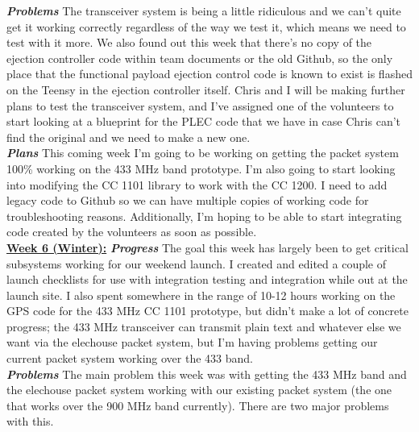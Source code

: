 \documentclass[onecolumn, draftclsnofoot, 10pt, compsoc]{IEEEtran}
\begin{document}
\textbf{\textit{{Problems}}}
\newline The transceiver system is being a little ridiculous and we can't quite get it working correctly regardless of the way we test it, which means we need to test with it more. We also found out this week that there's no copy of the ejection controller code within team documents or the old Github, so the only place that the functional payload ejection control code is known to exist is flashed on the Teensy in the ejection controller itself. Chris and I will be making further plans to test the transceiver system, and I've assigned one of the volunteers to start looking at a blueprint for the PLEC code that we have in case Chris can't find the original and we need to make a new one. \\

\textbf{\textit{{Plans}}}
\newline This coming week I'm going to be working on getting the packet system 100\% working on the 433 MHz band prototype. I'm also going to start looking into modifying the CC 1101 library to work with the CC 1200. I need to add legacy code to Github so we can have multiple copies of working code for troubleshooting reasons. Additionally, I'm hoping to be able to start integrating code created by the volunteers as soon as possible. \\

\underline{\textbf{Week 6 (Winter):}}
\newline\textbf{\textit{{Progress}}}
\newline The goal this week has largely been to get critical subsystems working for our weekend launch. I created and edited a couple of launch checklists for use with integration testing and integration while out at the launch site. I also spent somewhere in the range of 10-12 hours working on the GPS code for the 433 MHz CC 1101 prototype, but didn't make a lot of concrete progress; the 433 MHz transceiver can transmit plain text and whatever else we want via the elechouse packet system, but I'm having problems getting our current packet system working over the 433 band. \\

\textbf{\textit{{Problems}}}
\newline The main problem this week was with getting the 433 MHz band and the elechouse packet system working with our existing packet system (the one that works over the 900 MHz band currently). There are two major problems with this. \\
\end{document}

